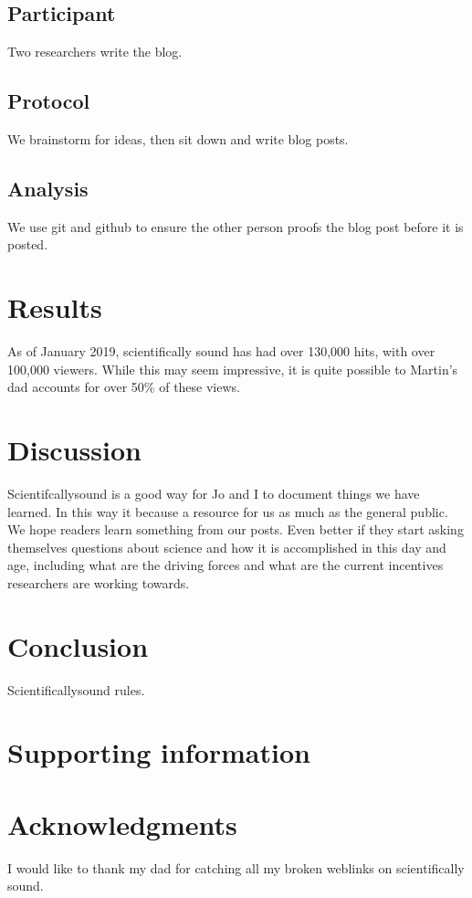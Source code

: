 \documentclass[10pt,letterpaper]{article}
\begin{document}
\subsection*{Participant}
Two researchers write the blog.

\subsection*{Protocol}
We brainstorm for ideas, then sit down and write blog posts.

\subsection*{Analysis}
We use git and github to ensure the other person proofs the blog post before it is posted.

\section*{Results}
As of January 2019, scientifically sound has had over 130,000 hits, with over 100,000 viewers. 
While this may seem impressive, it is quite possible to Martin's dad accounts for over 50\% of these views.

\section*{Discussion}
Scientifcallysound is a good way for Jo and I to document things we have learned.
In this way it because a resource for us as much as the general public.
We hope readers learn something from our posts.
Even better if they start asking themselves questions about science and how it is accomplished in this day and age, including what are the driving forces and what are the current incentives researchers are working towards.

\section*{Conclusion}

Scientificallysound rules.

\section*{Supporting information}


\section*{Acknowledgments}
I would like to thank my dad for catching all my broken weblinks on scientifically sound.

\nolinenumbers
\end{document}
